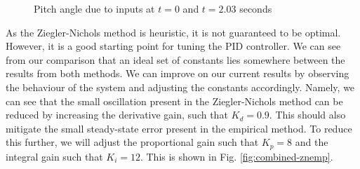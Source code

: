 \documentclass[12pt]{article}
\begin{document}
\begin{figure}
    \centering
    \caption{Pitch angle due to inputs at $t = 0$ and $t = 2.03$ seconds}
    \label{fig:tuning-comparison}
\end{figure}

As the Ziegler-Nichols method is heuristic, it is not guaranteed to be optimal. However, it is a good starting point for tuning the PID controller. We can see from our comparison that an ideal set of constants lies somewhere between the results from both methods. We can improve on our current results by observing the behaviour of the system and adjusting the constants accordingly. Namely, we can see that the small oscillation present in the Ziegler-Nichols method can be reduced by increasing the derivative gain, such that $K_d = 0.9$. This should also mitigate the small steady-state error present in the empirical method. To reduce this further, we will adjust the proportional gain such that $K_p = 8$ and the integral gain such that $K_i = 12$. This is shown in Fig. \ref{fig:combined-znemp}.
\end{document}
